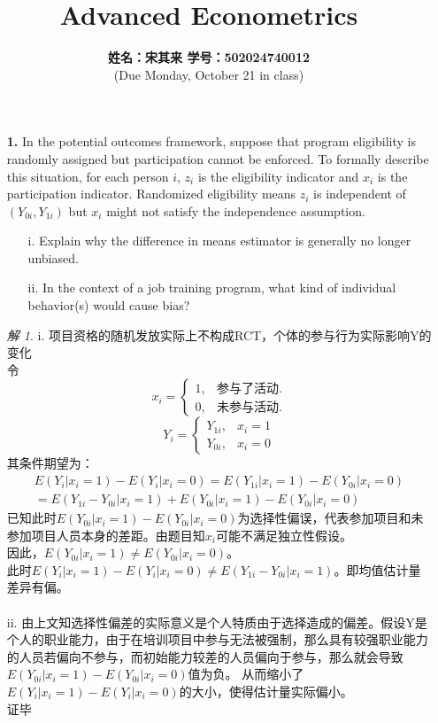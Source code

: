 \documentclass[a4paper]{ctexart}
\title{\vspace{-0.3in}\textbf{Advanced Econometrics}}
\author{\textbf{姓名：宋其来 \quad 学号：502024740012}\\(Due Monday, October 21 in class)}
\date{}
\theoremstyle{remark}
\newtheorem*{solution}{解}
\renewcommand{\qedsymbol}{证毕}
\begin{document}
\maketitle



\begin{itemize}
\item[\textbf{1.}] In the potential outcomes framework, suppose that program eligibility is randomly assigned but participation cannot be enforced. To formally describe this situation, for each person $i$, $z_i$ is the eligibility indicator and $x_i$ is the participation indicator. Randomized eligibility means $z_i$ is independent of $(Y_{0i}, Y_{1i})$ but $x_i$ might not satisfy the independence assumption.
\begin{enumerate}
\item[i.] Explain why the difference in means estimator is generally no longer unbiased.
\item[ii.] In the context of a job training program, what kind of individual behavior(s) would cause bias?
\end{enumerate}

\begin{solution}
    i. 项目资格的随机发放实际上不构成RCT，个体的参与行为实际影响Y的变化\\
    令
    \begin{equation*} 
        x_i = 
        \begin{cases}
            1, &\text{参与了活动.} \\
            0, &\text{未参与活动.}
        \end{cases}
    \end{equation*}
    \begin{equation*}
        Y_i = 
        \begin{cases}
            Y_{1i}, &{x_i = 1} \\
            Y_{0i}, &{x_i = 0}
        \end{cases} 
    \end{equation*}
    其条件期望为：
    \begin{align*}
        E(Y_i|x_i=1) - E(Y_i|x_i=0) = E(Y_{1i}|x_i=1)-E(Y_{0i}|x_i=0)\\
        =E(Y_{1i}-Y_{0i}|x_i=1)+E(Y_{0i}|x_i=1)-E(Y_{0i}|x_i=0)
    \end{align*}
    已知此时$E(Y_{0i}|x_i=1)-E(Y_{0i}|x_i=0)$为选择性偏误，代表参加项目和未参加项目人员本身的差距。由题目知$x_i$可能不满足独立性假设。\\
    因此，$E(Y_{0i}|x_i=1)\neq E(Y_{0i}|x_i=0)$。\\
    此时$E(Y_i|x_i=1) - E(Y_i|x_i=0) \neq E(Y_{1i}-Y_{0i}|x_i=1)$。即均值估计量差异有偏。\\
    \\
    ii. 由上文知选择性偏差的实际意义是个人特质由于选择造成的偏差。假设Y是个人的职业能力，由于在培训项目中参与无法被强制，那么具有较强职业能力的人员若偏向不参与，而初始能力较差的人员偏向于参与，那么就会导致$E(Y_{0i}|x_i=1)-E(Y_{0i}|x_i=0)$值为负。
    从而缩小了$E(Y_i|x_i=1) - E(Y_i|x_i=0)$的大小，使得估计量实际偏小。
    \\
    \qedsymbol
\end{solution}


\end{itemize}
\end{document}

